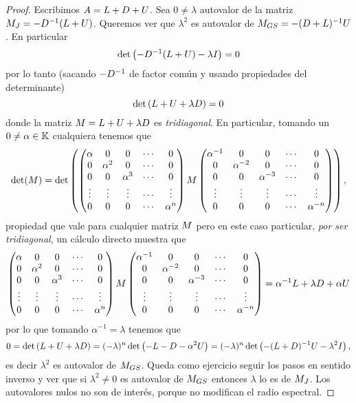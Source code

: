 \begin{proof}
Escribimos $\Ab=\Lb+\Db+\Ub$. Sea $0\neq \lambda$ autovalor de la matriz $\Mb_{J}=-\Db^{-1}(\Lb+\Ub)$. Queremos ver que $\lambda^2$ es autovalor de $\Mb_{GS}=-(\Db +\Lb)^{-1}\Ub$. En particular
$$
\det \left( -\Db^{-1}(\Lb+\Ub)-\lambda \Ib \right) =0
$$ por lo tanto (sacando $-\Db^{-1}$ de factor común y usando propiedades del determinante)
$$\det \left(\Lb+\Ub+\lambda \Db \right) =0$$
donde la matriz $\Mb=\Lb+\Ub+\lambda \Db $ es \emph{tridiagonal}. En particular, tomando un $0\neq\alpha\in \mathbb K$ cualquiera tenemos que
$$
\det(\Mb)=\det\left(
\begin{pmatrix}
\alpha&0&0&\cdots&0\\
0&\alpha^2&0&\cdots&0\\
0&0&\alpha^3&\cdots&0\\
\vdots&\vdots&\vdots&\cdots&\vdots\\
0&0&0&\cdots&\alpha^{n}
\end{pmatrix}
\Mb
\begin{pmatrix}
\alpha^{-1}&0&0&\cdots&0\\
0&\alpha^{-2}&0&\cdots&0\\
0&0&\alpha^{-3}&\cdots&0\\
\vdots&\vdots&\vdots&\cdots&\vdots\\
0&0&0&\cdots&\alpha^{-n}
\end{pmatrix}\right),
$$
propiedad que vale para cualquier matriz $\Mb$ pero en este caso particular, \emph{por ser tridiagonal}, un cálculo directo muestra que
$$
\begin{pmatrix}
\alpha&0&0&\cdots&0\\
0&\alpha^2&0&\cdots&0\\
0&0&\alpha^3&\cdots&0\\
\vdots&\vdots&\vdots&\cdots&\vdots\\
0&0&0&\cdots&\alpha^{n}
\end{pmatrix}
\Mb
\begin{pmatrix}
\alpha^{-1}&0&0&\cdots&0\\
0&\alpha^{-2}&0&\cdots&0\\
0&0&\alpha^{-3}&\cdots&0\\
\vdots&\vdots&\vdots&\cdots&\vdots\\
0&0&0&\cdots&\alpha^{-n}
\end{pmatrix}=\alpha^{-1} \Lb+\lambda \Db +\alpha\Ub
$$
por lo que tomando $\alpha^{-1}=\lambda$ tenemos que
$$0=\det \left(\Lb+\Ub+\lambda \Db \right)=(-\lambda)^n \det \left(-\Lb-\Db -\alpha^2\Ub \right)=(-\lambda)^n \det \left(-(\Lb+\Db)^{-1}\Ub -\lambda^2\Ib \right),$$
es decir $\lambda^2$ es autovalor de $\Mb_{GS}$. Queda como ejercicio seguir los pasos en sentido inverso y ver que si $\lambda^2\neq 0$ es autovalor de $\Mb_{GS}$ entonces
$\lambda$ lo es de $\Mb_{J}$. Los autovalores nulos no son de interés, porque no modifican el radio espectral.
\end{proof}


